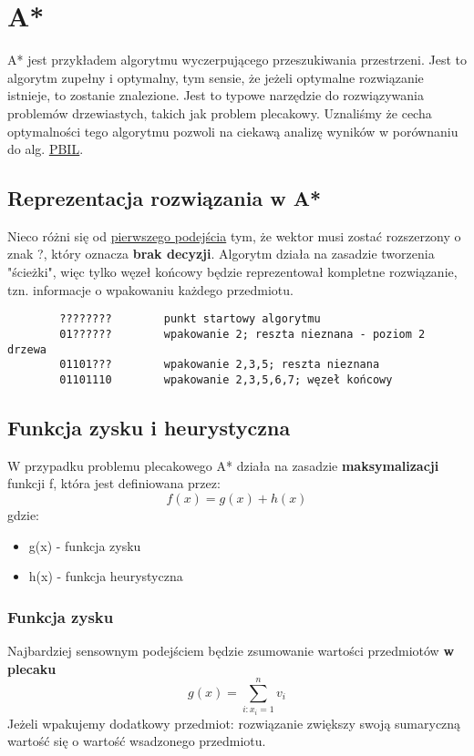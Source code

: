 \documentclass[11pt]{article}
\begin{document}
\section{A*}
\label{sec:org9b81fc2}
A* jest przykładem algorytmu wyczerpującego przeszukiwania przestrzeni. Jest to algorytm zupełny i optymalny, tym sensie, że jeżeli optymalne rozwiązanie istnieje, to zostanie znalezione. Jest to typowe narzędzie do rozwiązywania problemów drzewiastych, takich jak problem plecakowy. Uznaliśmy że cecha optymalności tego algorytmu pozwoli na ciekawą analizę wyników w porównaniu do alg. \hyperref[sec:org20e38e5]{\uline{PBIL}}.
\subsection{Reprezentacja rozwiązania w A*}
\label{sec:orgd9a5091}
Nieco różni się od \hyperref[sec:org357917a]{pierwszego podejścia} tym, że wektor musi zostać rozszerzony o znak ?, który oznacza \textbf{brak decyzji}. Algorytm działa na zasadzie tworzenia "ścieżki", więc tylko węzeł końcowy będzie reprezentował kompletne rozwiązanie, tzn. informacje o wpakowaniu każdego przedmiotu.
\begin{verbatim}
        ????????        punkt startowy algorytmu
        01??????        wpakowanie 2; reszta nieznana - poziom 2 drzewa
        01101???        wpakowanie 2,3,5; reszta nieznana
        01101110        wpakowanie 2,3,5,6,7; węzeł końcowy
\end{verbatim}
\subsection{Funkcja zysku i heurystyczna}
\label{sec:orgaf87a29}
W przypadku problemu plecakowego A* działa na zasadzie \textbf{maksymalizacji} funkcji f, która jest definiowana przez:
\[
        f(x) = g(x) + h(x)
\]
gdzie:
\begin{itemize}
\item g(x) - funkcja zysku
\item h(x) - funkcja heurystyczna
\end{itemize}
\subsubsection{Funkcja zysku}
\label{sec:org3b8c70e}
Najbardziej sensownym podejściem będzie zsumowanie wartości przedmiotów \textbf{w plecaku}
\[
        g(x) = \sum_{i:x_i=1}^n{v_i}
\]
Jeżeli wpakujemy dodatkowy przedmiot: rozwiązanie zwiększy swoją sumaryczną wartość się o wartość wsadzonego przedmiotu.
\end{document}
